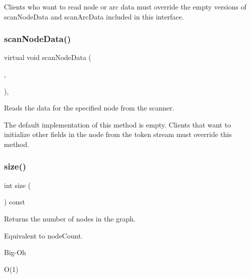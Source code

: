 Clients who want to read node or arc data must override the empty versions of {\ttfamily scan\+Node\+Data} and {\ttfamily scan\+Arc\+Data} included in this interface. \mbox{\label{classGraph_a0fc2ca3535b7bff7759aa0c1d35ff08b}} 
\subsubsection{\texorpdfstring{scan\+Node\+Data()}{scanNodeData()}}
{\footnotesize\ttfamily virtual void scan\+Node\+Data (\begin{DoxyParamCaption}\item[{\mbox{\hyperlink{classTokenScanner}{Token\+Scanner}} \&}]{,  }\item[{Node\+Type $\ast$}]{ }\end{DoxyParamCaption})\hspace{0.3cm}{\ttfamily [inline]}, {\ttfamily [virtual]}}



Reads the data for the specified node from the scanner. 

The default implementation of this method is empty. Clients that want to initialize other fields in the node from the token stream must override this method. \mbox{\label{classGraph_af9593d4a5ff4274efaf429cb4f9e57cc}} 
\subsubsection{\texorpdfstring{size()}{size()}}
{\footnotesize\ttfamily int size (\begin{DoxyParamCaption}{ }\end{DoxyParamCaption}) const}



Returns the number of nodes in the graph. 

Equivalent to node\+Count. \begin{DoxyRefDesc}{Big-\/\+Oh}
\item[\mbox{\hyperlink{BigOh__BigOh000089}{Big-\/\+Oh}}]O(1) \end{DoxyRefDesc}
\mbox{\label{classGraph_a1fe5121d6528fdea3f243321b3fa3a49}} 
